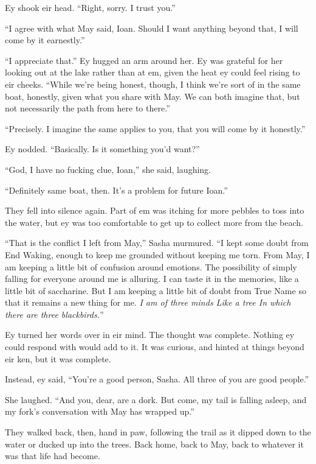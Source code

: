 Ey shook eir head. ``Right, sorry. I trust you.''

``I agree with what May said, Ioan. Should I want anything beyond that, I will come by it earnestly.''

``I appreciate that.'' Ey hugged an arm around her. Ey was grateful for her looking out at the lake rather than at em, given the heat ey could feel rising to eir cheeks. ``While we're being honest, though, I think we're sort of in the same boat, honestly, given what you share with May. We can both imagine that, but not necessarily the path from here to there.''

``Precisely. I imagine the same applies to you, that you will come by it honestly.''

Ey nodded. ``Basically. Is it something you'd want?''

``God, I have no fucking clue, Ioan,'' she said, laughing.

``Definitely same boat, then. It's a problem for future Ioan.''

They fell into silence again. Part of em was itching for more pebbles to toss into the water, but ey was too comfortable to get up to collect more from the beach.

``That is the conflict I left from May,'' Sasha murmured. ``I kept some doubt from End Waking, enough to keep me grounded without keeping me torn. From May, I am keeping a little bit of confusion around emotions. The possibility of simply falling for everyone around me is alluring. I can taste it in the memories, like a little bit of saccharine. But I am keeping a little bit of doubt from True Name so that it remains a new thing for me. \emph{I am of three minds Like a tree In which there are three blackbirds.}''

Ey turned her words over in eir mind. The thought was complete. Nothing ey could respond with would add to it. It was curious, and hinted at things beyond eir ken, but it was complete.

Instead, ey said, ``You're a good person, Sasha. All three of you are good people.''

She laughed. ``And you, dear, are a dork. But come, my tail is falling asleep, and my fork's conversation with May has wrapped up.''

They walked back, then, hand in paw, following the trail as it dipped down to the water or ducked up into the trees. Back home, back to May, back to whatever it was that life had become.
